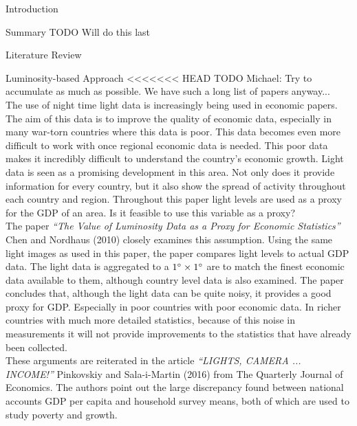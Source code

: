 \documentclass[12pt,fleqn,leqno,letterpaper]{article}
\begin{document}
\begin{section}{Introduction}
  \begin{subsection}{Summary}
    TODO Will do this last
  \end{subsection}
  \begin{subsection}{Literature Review}
    \begin{subsubsection}{Luminosity-based Approach}
<<<<<<< HEAD
      TODO Michael: Try to accumulate as much as possible. We have such a long list of papers anyway...\\
      The use of night time light data is increasingly being used in economic papers. The aim of this data is to improve the quality of economic data, especially in many war-torn countries where this data is poor. This data becomes even more difficult to work with once regional economic data is needed. This poor data makes it incredibly difficult to understand the country's economic growth. Light data is seen as a promising development in this area. Not only does it provide information for every country, but it also show the spread of activity throughout each country and region. Throughout this paper light levels are used as a proxy for the GDP of an area. Is it feasible to use this variable as a proxy? \\
      
      The paper \textit{``The Value of Luminosity Data as a Proxy for Economic Statistics''} Chen and Nordhaus (2010) closely examines this assumption. Using the same light images as used in this paper, the paper compares light levels to actual GDP data. The light data is aggregated to a $1\degree\times 1\degree$ are to match the finest economic data available to them, although country level data is also examined. The paper concludes that, although the light data can be quite noisy, it provides a good proxy for GDP. Especially in poor countries with poor economic data. In richer countries with much more detailed statistics, because of this noise in measurements it will not provide improvements to the statistics that have already been collected. \\
      
      These arguments are reiterated in the article \textit{``LIGHTS, CAMERA ... INCOME!''}  Pinkovskiy and Sala-i-Martin (2016) from The Quarterly Journal of Economics. The authors point out the large discrepancy found between national accounts GDP  per  capita and household survey means, both of which are used to study poverty and growth. \\
      

\end{subsubsection}
\end{subsection}
\end{section}
\end{document}
